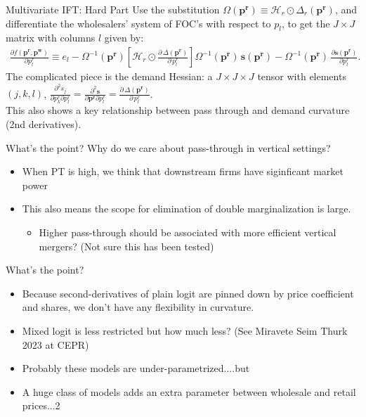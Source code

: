 \begin{frame}{Multivariate IFT: Hard Part}
Use the substitution $\Omega(\mathbf{p^r}) \equiv \mathcal{H}_r \odot \Delta_{r}(\mathbf{p^r})$, and differentiate the wholesalers' system of FOC's with respect to $p_l$, to get the $J \times J$ matrix with columns $l$ given by:
\begin{align}
\frac{\partial f(\mathbf{p^r},\mathbf{p^w})}{\partial p_l^r} \equiv e_l - \Omega^{-1}(\mathbf{p^r})
\left[  \mathcal{H}_{r} \odot \frac{\partial\, \Delta(\mathbf{p^r})}{\partial\, p_l^r} \right]
\Omega^{-1}(\mathbf{p^r})\,
\mathbf{s}(\mathbf{p^r}) -\Omega^{-1}(\mathbf{p^r})\, \frac{\partial \mathbf{s}(\mathbf{p^r})}{\partial p_l^r}.
\end{align}
The complicated piece is the demand Hessian: a $J \times J \times J$ tensor with elements $(j,k,l)$, $\frac{\partial^2 s_j}{\partial p_k^r \partial p_l^r} = \frac{\partial^2 \mathbf{s}}{\partial \mathbf{p^r} \partial p_l^r}=\frac{\partial\, \Delta(\mathbf{p^r})}{\partial\, p_l^r}$.\\

This also shows a key relationship between \alert{pass through} and \alert{demand curvature} (2nd derivatives).
\end{frame}



\begin{frame}{What's the point?}
Why do we care about pass-through in vertical settings?
\begin{itemize}
\item When PT is high, we think that downstream firms have siginficant market power
\item This also means the scope for \alert{elimination of double marginalization} is large.
\begin{itemize}
\item Higher pass-through should be associated with more efficient vertical mergers? (Not sure this has been tested)
\end{itemize}
\end{itemize}
\end{frame}




\begin{frame}{What's the point?}

\begin{itemize}
\item Because second-derivatives of plain logit are pinned down by price coefficient and shares, we don't have any flexibility in curvature.
\item Mixed logit is less restricted but how much less? (See Miravete Seim Thurk 2023 at CEPR)
\item Probably these models are under-parametrized....but
\item A huge class of models adds an extra parameter between wholesale and retail prices...2
\end{itemize}
\end{frame}



